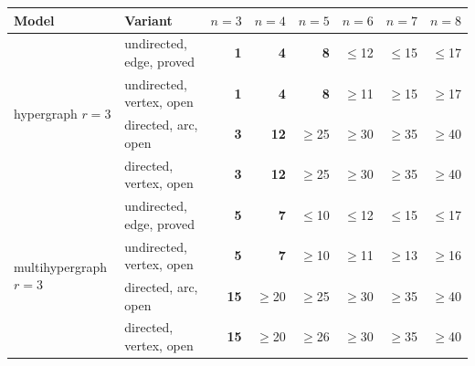 \begin{tabular}{llrrrrrr}
\toprule
Model & Variant & $n=3$ & $n=4$ & $n=5$ & $n=6$ & $n=7$ & $n=8$ \\
\midrule
\multirow{4}{*}{hypergraph $r=3$} & undirected, edge, \textcolor{vtProved}{proved} & \textcolor{vtExact}{\textbf{1}} & \textcolor{vtExact}{\textbf{4}} & \textcolor{vtExact}{\textbf{8}} & \textcolor{vtProved}{$\le$12} & \textcolor{vtProved}{$\le$15} & \textcolor{vtProved}{$\le$17} \\
 & undirected, vertex, \textcolor{vtOpen}{open} & \textcolor{vtExact}{\textbf{1}} & \textcolor{vtExact}{\textbf{4}} & \textcolor{vtExact}{\textbf{8}} & \textcolor{vtOpen}{$\ge$11} & \textcolor{vtOpen}{$\ge$15} & \textcolor{vtOpen}{$\ge$17} \\
 & directed, arc, \textcolor{vtOpen}{open} & \textcolor{vtExact}{\textbf{3}} & \textcolor{vtExact}{\textbf{12}} & \textcolor{vtOpen}{$\ge$25} & \textcolor{vtOpen}{$\ge$30} & \textcolor{vtOpen}{$\ge$35} & \textcolor{vtOpen}{$\ge$40} \\
 & directed, vertex, \textcolor{vtOpen}{open} & \textcolor{vtExact}{\textbf{3}} & \textcolor{vtExact}{\textbf{12}} & \textcolor{vtOpen}{$\ge$25} & \textcolor{vtOpen}{$\ge$30} & \textcolor{vtOpen}{$\ge$35} & \textcolor{vtOpen}{$\ge$40} \\
\midrule
\multirow{4}{*}{multihypergraph $r=3$} & undirected, edge, \textcolor{vtProved}{proved} & \textcolor{vtExact}{\textbf{5}} & \textcolor{vtExact}{\textbf{7}} & \textcolor{vtProved}{$\le$10} & \textcolor{vtProved}{$\le$12} & \textcolor{vtProved}{$\le$15} & \textcolor{vtProved}{$\le$17} \\
 & undirected, vertex, \textcolor{vtOpen}{open} & \textcolor{vtExact}{\textbf{5}} & \textcolor{vtExact}{\textbf{7}} & \textcolor{vtOpen}{$\ge$10} & \textcolor{vtOpen}{$\ge$11} & \textcolor{vtOpen}{$\ge$13} & \textcolor{vtOpen}{$\ge$16} \\
 & directed, arc, \textcolor{vtOpen}{open} & \textcolor{vtExact}{\textbf{15}} & \textcolor{vtOpen}{$\ge$20} & \textcolor{vtOpen}{$\ge$25} & \textcolor{vtOpen}{$\ge$30} & \textcolor{vtOpen}{$\ge$35} & \textcolor{vtOpen}{$\ge$40} \\
 & directed, vertex, \textcolor{vtOpen}{open} & \textcolor{vtExact}{\textbf{15}} & \textcolor{vtOpen}{$\ge$20} & \textcolor{vtOpen}{$\ge$26} & \textcolor{vtOpen}{$\ge$30} & \textcolor{vtOpen}{$\ge$35} & \textcolor{vtOpen}{$\ge$40} \\
\bottomrule
\end{tabular}
